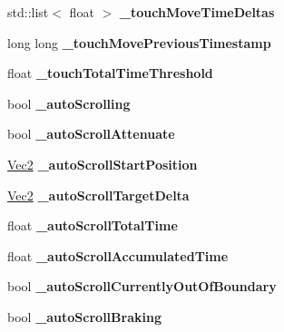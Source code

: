 \begin{DoxyCompactItemize}
std\+::list$<$ float $>$ {\bfseries \+\_\+touch\+Move\+Time\+Deltas}
\item 
\mbox{\label{classui_1_1ScrollView_af43a4998747f4a9b367a07094872c1e3}} 
long long {\bfseries \+\_\+touch\+Move\+Previous\+Timestamp}
\item 
\mbox{\label{classui_1_1ScrollView_a687171c85c49924383bd25ed30f20be6}} 
float {\bfseries \+\_\+touch\+Total\+Time\+Threshold}
\item 
\mbox{\label{classui_1_1ScrollView_a0b3a9f2aa324a078473642a5f379720e}} 
bool {\bfseries \+\_\+auto\+Scrolling}
\item 
\mbox{\label{classui_1_1ScrollView_a57fd13240c7e47b3e53ce675a72fc4c6}} 
bool {\bfseries \+\_\+auto\+Scroll\+Attenuate}
\item 
\mbox{\label{classui_1_1ScrollView_a6c74c7f05c2306e990dbf8cd6e15c256}} 
\hyperlink{classVec2}{Vec2} {\bfseries \+\_\+auto\+Scroll\+Start\+Position}
\item 
\mbox{\label{classui_1_1ScrollView_ab3654fd29e220855d27d551ec1d6db29}} 
\hyperlink{classVec2}{Vec2} {\bfseries \+\_\+auto\+Scroll\+Target\+Delta}
\item 
\mbox{\label{classui_1_1ScrollView_a1c43440bdc199aca479350a71a4680bb}} 
float {\bfseries \+\_\+auto\+Scroll\+Total\+Time}
\item 
\mbox{\label{classui_1_1ScrollView_a2a1171527102a55a9c98db03d774a775}} 
float {\bfseries \+\_\+auto\+Scroll\+Accumulated\+Time}
\item 
\mbox{\label{classui_1_1ScrollView_adcac2d4e52666e474ad5ffa41b3de9eb}} 
bool {\bfseries \+\_\+auto\+Scroll\+Currently\+Out\+Of\+Boundary}
\item 
\mbox{\label{classui_1_1ScrollView_a5015b07ae7ac5ded90a962af24779f1b}} 
bool {\bfseries \+\_\+auto\+Scroll\+Braking}
\item 
\mbox{\label{classui_1_1ScrollView_a3a4e5a78325428e62fd801c21bbb62a1}} 

\end{DoxyCompactItemize}
